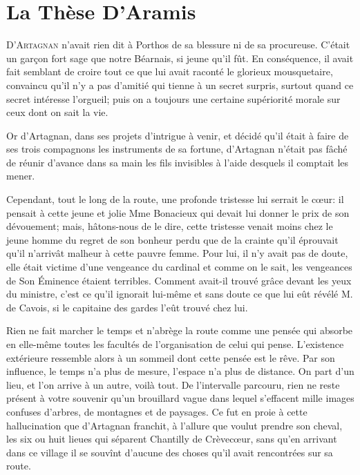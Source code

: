 
\chapter{La Thèse D'Aramis} 
	
\lettrine{D}{'Artagnan} n'avait rien dit à Porthos de sa blessure ni de sa procureuse. C'était un garçon fort sage que notre Béarnais, si jeune qu'il fût. En conséquence, il avait fait semblant de croire tout ce que lui avait raconté le glorieux mousquetaire, convaincu qu'il n'y a pas d'amitié qui tienne à un secret surpris, surtout quand ce secret intéresse l'orgueil; puis on a toujours une certaine supériorité morale sur ceux dont on sait la vie. 

Or d'Artagnan, dans ses projets d'intrigue à venir, et décidé qu'il était à faire de ses trois compagnons les instruments de sa fortune, d'Artagnan n'était pas fâché de réunir d'avance dans sa main les fils invisibles à l'aide desquels il comptait les mener. 

Cependant, tout le long de la route, une profonde tristesse lui serrait le cœur: il pensait à cette jeune et jolie Mme Bonacieux qui devait lui donner le prix de son dévouement; mais, hâtons-nous de le dire, cette tristesse venait moins chez le jeune homme du regret de son bonheur perdu que de la crainte qu'il éprouvait qu'il n'arrivât malheur à cette pauvre femme. Pour lui, il n'y avait pas de doute, elle était victime d'une vengeance du cardinal et comme on le sait, les vengeances de Son Éminence étaient terribles. Comment avait-il trouvé grâce devant les yeux du ministre, c'est ce qu'il ignorait lui-même et sans doute ce que lui eût révélé M. de Cavois, si le capitaine des gardes l'eût trouvé chez lui. 

Rien ne fait marcher le temps et n'abrège la route comme une pensée qui absorbe en elle-même toutes les facultés de l'organisation de celui qui pense. L'existence extérieure ressemble alors à un sommeil dont cette pensée est le rêve. Par son influence, le temps n'a plus de mesure, l'espace n'a plus de distance. On part d'un lieu, et l'on arrive à un autre, voilà tout. De l'intervalle parcouru, rien ne reste présent à votre souvenir qu'un brouillard vague dans lequel s'effacent mille images confuses d'arbres, de montagnes et de paysages. Ce fut en proie à cette hallucination que d'Artagnan franchit, à l'allure que voulut prendre son cheval, les six ou huit lieues qui séparent Chantilly de Crèvecœur, sans qu'en arrivant dans ce village il se souvînt d'aucune des choses qu'il avait rencontrées sur sa route. 

